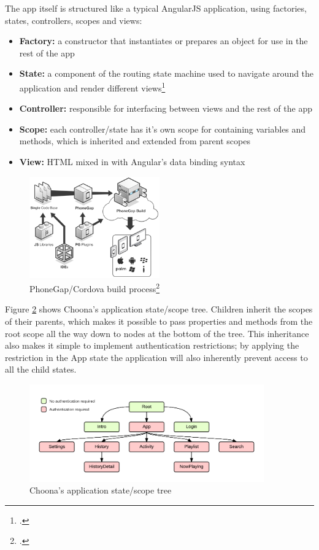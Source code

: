 The app itself is structured like a typical AngularJS application, using factories, states, controllers, scopes and views:

\begin{itemize}
  \item \textbf{Factory:} a constructor that instantiates or prepares an object for use in the rest of the app
  \item \textbf{State:} a component of the routing state machine used to navigate around the application and render different views\footcite{router}
  \item \textbf{Controller:} responsible for interfacing between views and the rest of the app
  \item \textbf{Scope:} each controller/state has it's own scope for containing variables and methods, which is inherited and extended from parent scopes
  \item \textbf{View:} HTML mixed in with Angular's data binding syntax
\end{itemize}

\begin{figure}[h!]
  \centering
  \includegraphics[width=0.5\textwidth]{./img/phonegap.png}
  \caption{PhoneGap/Cordova build process\footcite{phonegap}}
  \label{fig:phonegap}
\end{figure}

Figure \ref{fig:state} shows Choona's application state/scope tree. Children inherit the scopes of their parents, which makes it possible to pass properties and methods from the root scope all the way down to nodes at the bottom of the tree. This inheritance also makes it simple to implement authentication restrictions; by applying the restriction in the App state the application will also inherently prevent access to all the child states.

\begin{figure}[h!]
  \centering
  \includegraphics[width=0.9\textwidth]{./img/state.png}
  \caption{Choona's application state/scope tree}
  \label{fig:state}
\end{figure}

